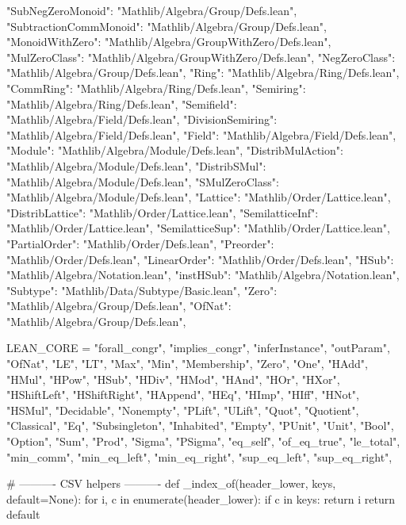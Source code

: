 \documentclass[11pt,reqno]{amsart}
\begin{document}
\begin{verbatimbox}
{	"SubNegZeroMonoid":             "Mathlib/Algebra/Group/Defs.lean",
	"SubtractionCommMonoid":        "Mathlib/Algebra/Group/Defs.lean",
	"MonoidWithZero":               "Mathlib/Algebra/GroupWithZero/Defs.lean",
	"MulZeroClass":                 "Mathlib/Algebra/GroupWithZero/Defs.lean",
	"NegZeroClass":                 "Mathlib/Algebra/Group/Defs.lean",
	"Ring":                         "Mathlib/Algebra/Ring/Defs.lean",
	"CommRing":                     "Mathlib/Algebra/Ring/Defs.lean",
	"Semiring":                     "Mathlib/Algebra/Ring/Defs.lean",
	"Semifield":                    "Mathlib/Algebra/Field/Defs.lean",
	"DivisionSemiring":             "Mathlib/Algebra/Field/Defs.lean",
	"Field":                        "Mathlib/Algebra/Field/Defs.lean",
	"Module":                       "Mathlib/Algebra/Module/Defs.lean",
	"DistribMulAction":             "Mathlib/Algebra/Module/Defs.lean",
	"DistribSMul":                  "Mathlib/Algebra/Module/Defs.lean",
	"SMulZeroClass":                "Mathlib/Algebra/Module/Defs.lean",
	"Lattice":                      "Mathlib/Order/Lattice.lean",
	"DistribLattice":               "Mathlib/Order/Lattice.lean",
	"SemilatticeInf":               "Mathlib/Order/Lattice.lean",
	"SemilatticeSup":               "Mathlib/Order/Lattice.lean",
	"PartialOrder":                 "Mathlib/Order/Defs.lean",
	"Preorder":                     "Mathlib/Order/Defs.lean",
	"LinearOrder":                  "Mathlib/Order/Defs.lean",
	"HSub":                         "Mathlib/Algebra/Notation.lean",
	"instHSub":                     "Mathlib/Algebra/Notation.lean",
	"Subtype":                      "Mathlib/Data/Subtype/Basic.lean",
	"Zero":                         "Mathlib/Algebra/Group/Defs.lean",
	"OfNat":                        "Mathlib/Algebra/Group/Defs.lean",
}

LEAN_CORE = {
	"forall_congr", "implies_congr", "inferInstance", "outParam",
	"OfNat", "LE", "LT", "Max", "Min", "Membership", "Zero", "One",
	"HAdd", "HMul", "HPow", "HSub", "HDiv", "HMod", "HAnd", "HOr",
	"HXor", "HShiftLeft", "HShiftRight", "HAppend", "HEq", "HImp",
	"HIff", "HNot", "HSMul", "Decidable", "Nonempty", "PLift", "ULift",
	"Quot", "Quotient", "Classical", "Eq",
	"Subsingleton", "Inhabited", "Empty", "PUnit",
	"Unit", "Bool", "Option", "Sum", "Prod", "Sigma", "PSigma",
	"eq_self", "of_eq_true", "le_total",
	"min_comm", "min_eq_left", "min_eq_right",
	"sup_eq_left", "sup_eq_right",
}

# ---------- CSV helpers ----------
def _index_of(header_lower, keys, default=None):
for i, c in enumerate(header_lower):
if c in keys:
return i
return default


\end{verbatimbox}
\end{document}
